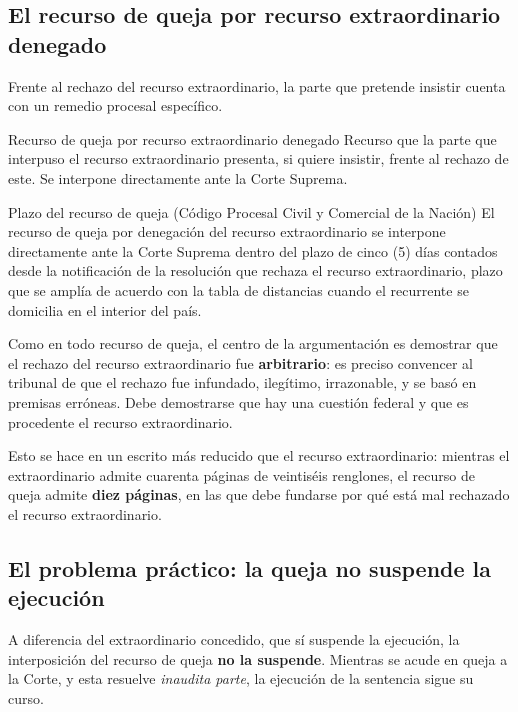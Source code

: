 \documentclass[12pt,oneside]{book}
\begin{document}
\subsection{El recurso de queja por recurso extraordinario denegado}

Frente al rechazo del recurso extraordinario, la parte que pretende insistir cuenta con un remedio procesal específico.

\begin{definition}{Recurso de queja por recurso extraordinario denegado}
Recurso que la parte que interpuso el recurso extraordinario presenta, si quiere insistir, frente al rechazo de este. Se interpone directamente ante la Corte Suprema.
\end{definition}

\begin{norma}{Plazo del recurso de queja (Código Procesal Civil y Comercial de la Nación)}
El recurso de queja por denegación del recurso extraordinario se interpone directamente ante la Corte Suprema dentro del plazo de cinco (5) días contados desde la notificación de la resolución que rechaza el recurso extraordinario, plazo que se amplía de acuerdo con la tabla de distancias cuando el recurrente se domicilia en el interior del país.
\end{norma}

Como en todo recurso de queja, el centro de la argumentación es demostrar que el rechazo del recurso extraordinario fue \textbf{arbitrario}: es preciso convencer al tribunal de que el rechazo fue infundado, ilegítimo, irrazonable, y se basó en premisas erróneas. Debe demostrarse que hay una cuestión federal y que es procedente el recurso extraordinario.

Esto se hace en un escrito más reducido que el recurso extraordinario: mientras el extraordinario admite cuarenta páginas de veintiséis renglones, el recurso de queja admite \textbf{diez páginas}, en las que debe fundarse por qué está mal rechazado el recurso extraordinario.

\subsection{El problema práctico: la queja no suspende la ejecución}

A diferencia del extraordinario concedido, que sí suspende la ejecución, la interposición del recurso de queja \textbf{no la suspende}. Mientras se acude en queja a la Corte, y esta resuelve \textit{inaudita parte}, la ejecución de la sentencia sigue su curso.
\end{document}
